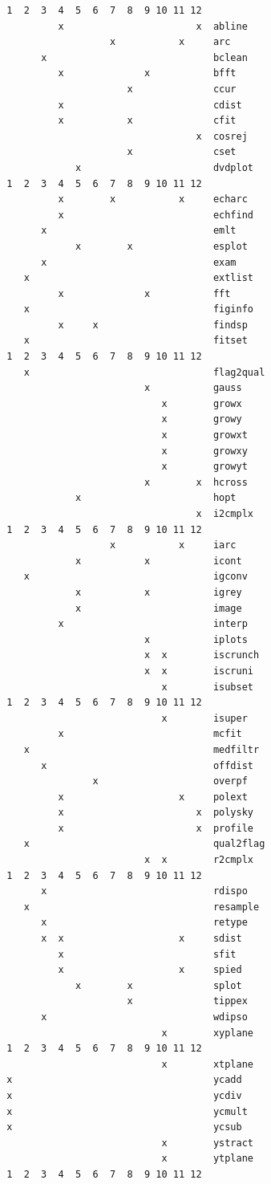 \begin{verbatim}
 1  2  3  4  5  6  7  8  9 10 11 12
          x                       x  abline
                   x           x     arc
       x                             bclean
          x              x           bfft
                      x              ccur
          x                          cdist
          x           x              cfit
                                  x  cosrej
                      x              cset
             x                       dvdplot
 1  2  3  4  5  6  7  8  9 10 11 12
          x        x           x     echarc
          x                          echfind
       x                             emlt
             x        x              esplot
       x                             exam
    x                                extlist
          x              x           fft
    x                                figinfo
          x     x                    findsp
    x                                fitset
 1  2  3  4  5  6  7  8  9 10 11 12
    x                                flag2qual
                         x           gauss
                            x        growx
                            x        growy
                            x        growxt
                            x        growxy
                            x        growyt
                         x        x  hcross
             x                       hopt
                                  x  i2cmplx
 1  2  3  4  5  6  7  8  9 10 11 12
                   x           x     iarc
             x           x           icont
    x                                igconv
             x           x           igrey
             x                       image
          x                          interp
                         x           iplots
                         x  x        iscrunch
                         x  x        iscruni
                            x        isubset
 1  2  3  4  5  6  7  8  9 10 11 12
                            x        isuper
          x                          mcfit
    x                                medfiltr
       x                             offdist
                x                    overpf
          x                    x     polext
          x                       x  polysky
          x                       x  profile
    x                                qual2flag
                         x  x        r2cmplx
 1  2  3  4  5  6  7  8  9 10 11 12
       x                             rdispo
    x                                resample
       x                             retype
       x  x                    x     sdist
          x                          sfit
          x                    x     spied
             x        x              splot
                      x              tippex
       x                             wdipso
                            x        xyplane
 1  2  3  4  5  6  7  8  9 10 11 12
                            x        xtplane
 x                                   ycadd
 x                                   ycdiv
 x                                   ycmult
 x                                   ycsub
                            x        ystract
                            x        ytplane
 1  2  3  4  5  6  7  8  9 10 11 12
\end{verbatim}
